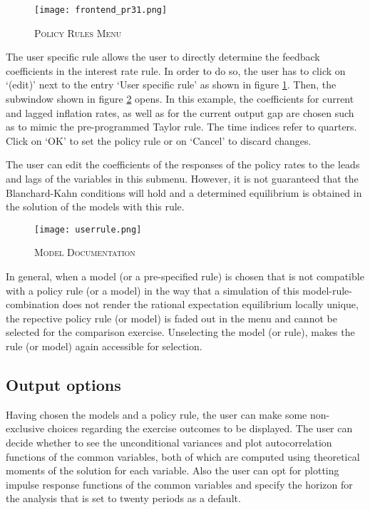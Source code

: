 \begin{figure}[H]
	\centering
	\caption{\textsc{Policy Rules Menu}}
	\vspace{0.2cm}
	\texttt{[image: frontend\_pr31.png]}\\
	\label{img:PR}
\end{figure}

The user specific rule allows the user to directly determine the feedback coefficients in the interest rate rule. In order to do so, the user has to click on `(edit)' next to the entry `User specific rule' as shown in figure \ref{img:PR}. Then, the subwindow shown in figure \ref{userrule} opens. In this example, the coefficients for current and lagged inflation rates, as well as for the current output gap are chosen such as to mimic the pre-programmed Taylor rule. The time indices refer to quarters. Click on `OK' to set the policy rule or on `Cancel' to discard changes.

The user can edit the coefficients of the responses of the policy rates to the leads and lags of the variables in this submenu. However, it is not guaranteed that the Blanchard-Kahn conditions will hold and a determined equilibrium is obtained in the solution of the models with this rule. 

\begin{figure}[H]
	\centering
	\caption{\textsc{Model Documentation}}
	\vspace{0.2cm}
	\texttt{[image: userrule.png]}\\
	\label{userrule}
\end{figure}

In general, when a model (or a pre-specified rule) is chosen that is not compatible with a policy rule (or a model) in the way that a simulation of this model-rule-combination does not render the rational expectation equilibrium locally unique, the repective policy rule (or model) is faded out in the menu and cannot be selected for the comparison exercise. Unselecting the model (or rule), makes the rule (or model) again accessible for selection. 

\subsection*{Output options}

Having chosen the models and a policy rule, the user can make some non-exclusive choices regarding the exercise outcomes to be displayed.
The user can decide whether to see the unconditional variances and plot autocorrelation functions of the common variables, both of which are computed using theoretical moments of the solution for each variable. Also the user can opt for plotting impulse response functions of the common variables and specify the horizon for the analysis that is set to twenty periods as a default. 

